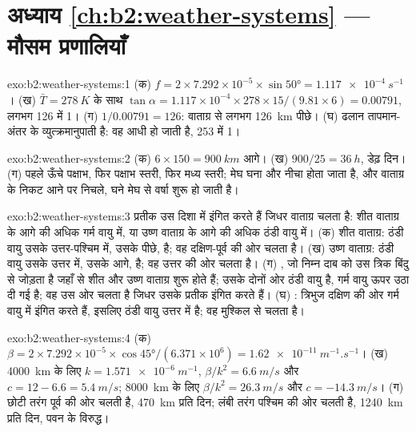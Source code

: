 \section*{अध्याय \ref{ch:b2:weather-systems} --- मौसम प्रणालियाँ}

\begin{solution}{exo:b2:weather-systems:1}
(क) $f = 2 \times 7.292 \times 10^{-5} \times \sin\ang{50} = \qty{1.117e-4}{s^{-1}}$। (ख)
$\bar T = \qty{278}{K}$ के साथ $\tan\alpha = 1.117 \times 10^{-4} \times 278 \times 15/(9.81 \times 6)
= 0.00791$, लगभग 126 में 1। (ग) $1/0.00791 = 126$: वाताग्र से लगभग \qty{126}{km} पीछे। (घ) ढलान
तापमान-अंतर के व्युत्क्रमानुपाती है: वह आधी हो जाती है, 253 में 1।
\end{solution}

\begin{solution}{exo:b2:weather-systems:2}
(क) $6 \times 150 = \qty{900}{km}$ आगे। (ख) $900/25 = \qty{36}{h}$, डेढ़ दिन। (ग) पहले
ऊँचे पक्षाभ, फिर पक्षाभ स्तरी, फिर मध्य स्तरी; मेघ घना और नीचा होता जाता है, और वाताग्र के निकट आने पर
निचले, घने मेघ से वर्षा शुरू हो जाती है।
\end{solution}

\begin{solution}{exo:b2:weather-systems:3}
प्रतीक उस दिशा में इंगित करते हैं जिधर वाताग्र चलता है: शीत वाताग्र के आगे की अधिक गर्म वायु में, या उष्ण वाताग्र के आगे की
अधिक ठंडी वायु में। (क) शीत वाताग्र: ठंडी वायु उसके उत्तर-पश्चिम में, उसके पीछे, है; वह दक्षिण-पूर्व की ओर
चलता है। (ख) उष्ण वाताग्र: ठंडी वायु उसके उत्तर में, उसके आगे, है; वह उत्तर की ओर चलता है।
(ग) , जो निम्न दाब को उस त्रिक बिंदु से जोड़ता है जहाँ से शीत और उष्ण वाताग्र
शुरू होते हैं; उसके दोनों ओर ठंडी वायु है, गर्म वायु ऊपर उठा दी गई है; वह उस ओर चलता है जिधर उसके
प्रतीक इंगित करते हैं। (घ) : त्रिभुज दक्षिण की ओर गर्म वायु में इंगित करते हैं, इसलिए ठंडी
वायु उत्तर में है; वह मुश्किल से चलता है।
\end{solution}

\begin{solution}{exo:b2:weather-systems:4}
(क) $\beta = 2 \times 7.292 \times 10^{-5} \times \cos\ang{45}/(6.371 \times 10^6) =
\qty{1.62e-11}{m^{-1}.s^{-1}}$। (ख) \qty{4000}{km} के लिए $k = \qty{1.571e-6}{m^{-1}}$, $\beta/k^2 =
\qty{6.6}{m/s}$ और $c = 12 - 6.6 = \qty{5.4}{m/s}$; \qty{8000}{km} के लिए $\beta/k^2 =
\qty{26.3}{m/s}$ और $c = \qty{-14.3}{m/s}$। (ग) छोटी तरंग पूर्व की ओर चलती है, \qty{470}{km} प्रति दिन;
लंबी तरंग पश्चिम की ओर चलती है, \qty{1240}{km} प्रति दिन, पवन के विरुद्ध।
\end{solution}

